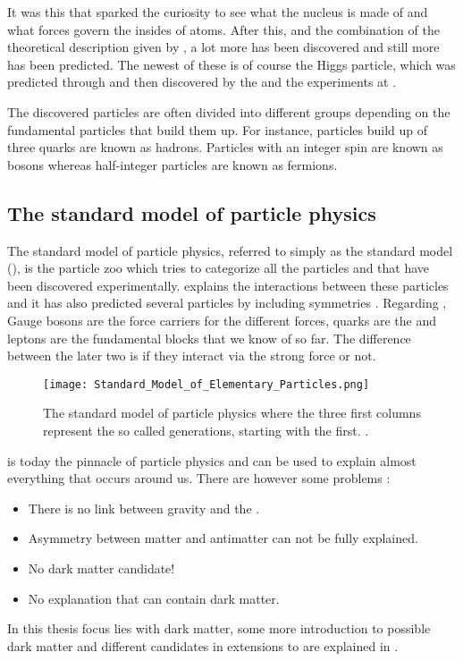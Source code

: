 It was this that sparked the curiosity to see what the nucleus is made of and what forces govern the insides of atoms. After this, and the combination of the theoretical description given by \abbrQM, a lot more has been discovered and still more has been predicted. The newest of these is of course the Higgs particle, which was predicted through \abbrQFT and then discovered by the \abbrATLAS and the \abbrCMS experiments at \abbrCERN \citep{Higgs:2012}. 

The discovered particles are often divided into different groups depending on the fundamental particles that build them up. For instance, particles build up of three quarks are known as hadrons. Particles with an integer spin are known as bosons whereas half-integer particles are known as fermions.

\subsection{The standard model of particle physics}\label{sec:tb:subsec:SM}
The standard model of particle physics, referred to simply as the standard model (\abbrSM), is the particle zoo which tries to categorize all the particles and that have been discovered experimentally. \abbrQFT explains the interactions between these particles and it has also predicted several particles by including symmetries \citep{Burchan:1995}. Regarding \abbrSM, Gauge bosons are the force carriers for the different forces, quarks are the and leptons are the fundamental blocks that we know of so far. The difference between the later two is if they interact via the strong force or not. 
\begin{SCfigure}[][h]
 \centering
\texttt{[image: Standard\_Model\_of\_Elementary\_Particles.png]}
  \caption{{\small The standard model of particle physics where the three first columns represent the so called generations, starting with the first. \citep{wiki1}.}}
    \label{fig:SM}
\end{SCfigure}

\abbrSM is today the pinnacle of particle physics and can be used to explain almost everything that occurs around us. There are however some problems \citep{Jungman:1996}:
\begin{itemize}
\item There is no link between gravity and the \abbrSM.
\item Asymmetry between matter and antimatter can not be fully explained.
\item No dark matter candidate!
\item No explanation that can contain dark matter.
\end{itemize} 
In this thesis focus lies with dark matter, some more introduction to possible dark matter and different candidates in extensions to \abbrSM are explained in .


